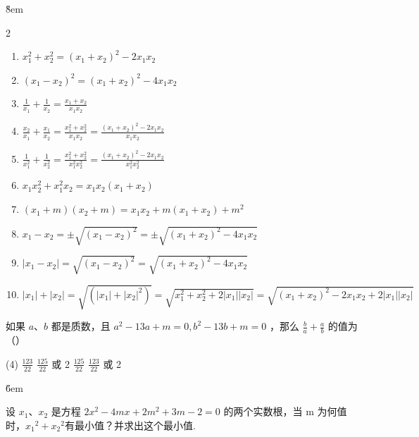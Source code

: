 \v{8em}

\begin{theorem}[常用的韦达定理构造]
    \begin{multicols}{2}
        \begin{enumerate}
            \item $x_1^2+x_2^2=\left(x_1+x_2\right)^2-2 x_1 x_2$
            \item $\left(x_1-x_2\right)^2=\left(x_1+x_2\right)^2-4 x_1 x_2$
            \item $\frac{1}{x_1}+\frac{1}{x_2}=\frac{x_1+x_2}{x_1 x_2}$
            \item $\frac{x_2}{x_1}+\frac{x_1}{x_2}=\frac{x_1^2+x_2^2}{x_1 x_2}=\frac{\left(x_1+x_2\right)^2-2 x_1 x_2}{x_1 x_2}$
            \item $\frac{1}{x_1^2}+\frac{1}{x_2^2}=\frac{x_1^2+x_2^2}{x_1^2 x_2^2}=\frac{\left(x_1+x_2\right)^2-2 x_1 x_2}{x_1^2 x_2^2}$
            \item $x_1 x_2^2+x_1^2 x_2=x_1 x_2\left(x_1+x_2\right)$
                  \columnbreak
            \item $\left(x_1+m\right)\left(x_2+m\right)=x_1 x_2+m\left(x_1+x_2\right)+m^2$
            \item $x_1-x_2= \pm \sqrt{\left(x_1-x_2\right)^2}= \pm \sqrt{\left(x_1+x_2\right)^2-4 x_1 x_2}$
            \item $\left|x_1-x_2\right|=\sqrt{\left(x_1-x_2\right)^2}=\sqrt{\left(x_1+x_2\right)^2-4 x_1 x_2}$
            \item $\left|x_1\right|+\left|x_2\right|=\sqrt{\left(\left|x_1\right|+\left|x_2\right|^2\right)}=\sqrt{x_1^2+x_2^2+2\left|x_1\right|\left|x_2\right|}=\sqrt{\left(x_1+x_2\right)^2-2 x_1 x_2+2\left|x_1\right|\left|x_2\right|}$
        \end{enumerate}
    \end{multicols}
\end{theorem}

\begin{example}
    如果 $a$、$b$ 都是质数，且 $a^2-13 a+m=0, b^2-13 b+m=0$ ，那么 $\frac{b}{a}+\frac{a}{b}$ 的值为 （\qquad）
    \begin{tasks}(4)
        \task $\frac{123}{22}$
        \task $\frac{125}{22}$ 或 2
        \task $\frac{125}{22}$
        \task $\frac{123}{22}$ 或 2
    \end{tasks}
\end{example}

\v{6em}

\begin{example}
    设 $x_1$、$x_2$ 是方程 $2 x^2-4 m x+2 m^2+3 m-2=0$ 的两个实数根，当 m 为何值时，$x_1{ }^2+x_2{ }^2$有最小值？并求出这个最小值.
\end{example}

